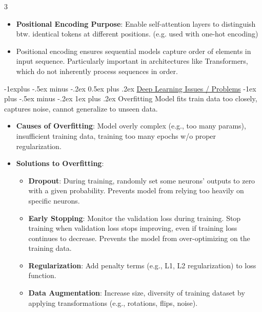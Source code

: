 \documentclass[a4paper, 9pt, landscape]{article}
\makeatletter
\renewcommand{\subsection}{\@startsection{subsection}{2}{0mm}%
                                {-1explus -.5ex minus -.2ex}%
                                {0.5ex plus .2ex}%
                                {\normalfont\normalsize\bfseries}}
\renewcommand{\subsubsection}{\@startsection{subsubsection}{3}{0mm}%
                                {-1ex plus -.5ex minus -.2ex}%
                                {1ex plus .2ex}%
                                {\normalfont\small\bfseries}}
\makeatother
\begin{document}
\begin{multicols*}{3}
\begin{itemize}
\item \textbf{Positional Encoding Purpose}: Enable self-attention layers to distinguish btw. identical tokens at different positions. (e.g. used with one-hot encoding)
\item Positional encoding ensures sequential models capture order of elements in input sequence. Particularly important in architectures like Transformers, which do not inherently process sequences in order.
\end{itemize}

\subsection{\underline{Deep Learning Issues / Problems}}
\subsubsection{Overfitting}
Model fits train data too closely, captures noise, cannot generalize to unseen data.
\begin{itemize}
\item \textbf{Causes of Overfitting}: Model overly complex (e.g., too many params), insufficient training data, training too many epochs w/o proper regularization.
\item \textbf{Solutions to Overfitting}:
	\begin{itemize}
	\item \textbf{Dropout}: During training, randomly set some neurons' outputs to zero with a given probability. Prevents model from relying too heavily on specific neurons.
	\item \textbf{Early Stopping}: Monitor the validation loss during training. Stop training when validation loss stops improving, even if training loss continues to decrease. Prevents the model from over-optimizing on the training data.
	\item \textbf{Regularization}: Add penalty terms (e.g., L1, L2 regularization) to loss function.
	\item \textbf{Data Augmentation}: Increase size, diversity of training dataset by applying transformations (e.g., rotations, flips, noise).
	\end{itemize}
\end{itemize}


\end{multicols*}
\end{document}
